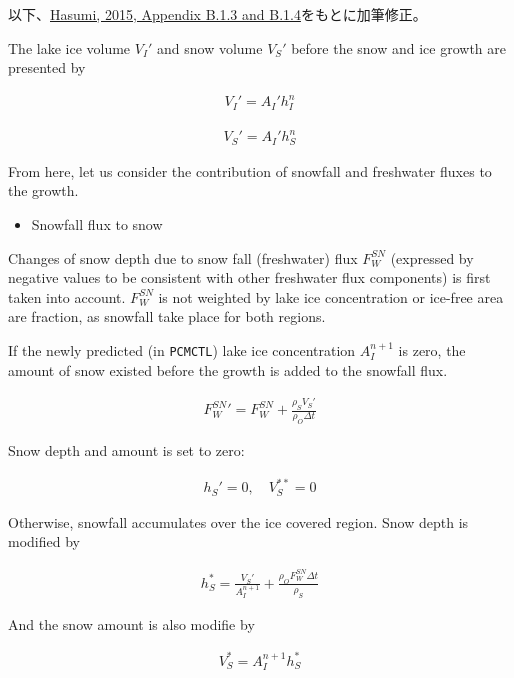 以下、\href{https://ccsr.aori.u-tokyo.ac.jp/~hasumi/COCO/coco4.pdf}{Hasumi,
2015, Appendix B.1.3 and B.1.4}をもとに加筆修正。

The lake ice volume \(V_I'\) and snow volume \(V_S'\) before the snow
and ice growth are presented by

\begin{eqnarray}
    V_I' = A_I' h_I^n
\end{eqnarray}

\begin{eqnarray}
    V_S' = A_I' h_S^n
\end{eqnarray}

From here, let us consider the contribution of snowfall and freshwater
fluxes to the growth.

\begin{itemize}
\tightlist
\item
  Snowfall flux to snow
\end{itemize}

Changes of snow depth due to snow fall (freshwater) flux \(F_W^{SN}\)
(expressed by negative values to be consistent with other freshwater
flux components) is first taken into account. \(F_W^{SN}\) is not
weighted by lake ice concentration or ice-free area are fraction, as
snowfall take place for both regions.

If the newly predicted (in \texttt{PCMCTL}) lake ice concentration
\(A_I^{n+1}\) is zero, the amount of snow existed before the growth is
added to the snowfall flux.

\begin{eqnarray}
    {F_W^{SN}}' = F_W^{SN} + \frac{\rho_S V_S'}{\rho_O \Delta t}
\end{eqnarray}

Snow depth and amount is set to zero:

\begin{eqnarray}
    h_S'=0, \quad V_S^{**} = 0
\end{eqnarray}

Otherwise, snowfall accumulates over the ice covered region. Snow depth
is modified by

\begin{eqnarray}
    h_S^* = \frac{V_S'}{A_I^{n+1}} + \frac{\rho_O F_W^{SN}\Delta t}{\rho_S}
\end{eqnarray}

And the snow amount is also modifie by

\begin{eqnarray}
    V_S^* = A_I^{n+1} h_S^*
\end{eqnarray}

